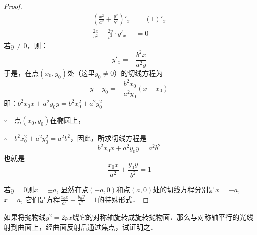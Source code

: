 \begin{proof}
\begin{align*}
    \left(\frac{x^2}{a^2}+\frac{y^2}{b^2}\right)'_x&=(1)'_x\\
    \frac{2x}{a^2}+\frac{2y}{b^2}\cdot y'_x&=0
\end{align*}
若$y\ne 0$，则：
\[y'_x=-\frac{b^2x}{a^2y}\]
于是，在点$(x_0,y_0)$处（这里$y_0\ne 0$）的切线方程为
\[y-y_0=-\frac{b^2x_0}{a^2y_0}(x-x_0)\]
即：$b^2x_0x+a^2y_0y=b^2x^2_0+a^2y^2_0$

$\because\quad $点$(x_0,y_0)$在椭圆上，

$\therefore\quad b^2x_0^2+a^2y^2_0=a^2b^2$，因此，所求切线方程是
\[b^2x_0 x+a^2y_0 y=a^2b^2\]
也就是
\[\frac{x_0x}{a^2}+\frac{y_0y}{b^2}=1\]

若$y=0$则$x=\pm a$, 显然在点$(-a,0)$和点$(a,0)$处的切线方程分别是$x=-a$, $x=a$, 它们是方程$\frac{x_0x}{a^2}+\frac{y_0y}{b^2}=1$的特殊形式．
\end{proof}
    
\begin{example}
    如果将抛物线$y^2=2px$绕它的对称轴旋转成旋转抛物面，那么与对称轴平行的光线射到曲面上，经曲面反射后通过焦点，试证明之．
\end{example}


